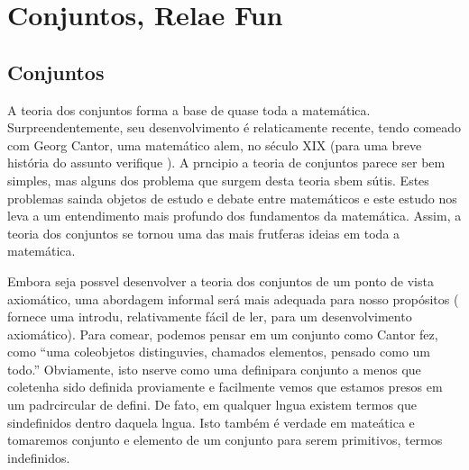 \chapter{Conjuntos, Rela\coes e Fun\coes}

\section{Conjuntos}\label{conjuntos}

A teoria dos conjuntos forma a base de quase toda a matem\'atica. Surpreendentemente, seu desenvolvimento \'e relaticamente recente, tendo come\cc ado com Georg Cantor, uma matem\'atico alem\aoi, no s\'eculo XIX (para uma breve hist\'oria do assunto verifique \cite{johnson:1972}). A pr\ih ncipio a teoria de conjuntos parece ser bem simples, mas alguns dos problema que surgem desta teoria s\ao bem s\'utis. Estes problemas s\ao ainda objetos de estudo e debate entre matem\'aticos e este estudo nos leva a um entendimento mais profundo dos fundamentos da matem\'atica. Assim, a teoria dos conjuntos se tornou uma das mais frut\ih feras ideias em toda a matem\'atica.

Embora seja poss\ih vel desenvolver a teoria dos conjuntos de um ponto de vista axiom\'atico, uma abordagem informal ser\'a mais adequada para nosso prop\'ositos (\cite{halmos:1974} fornece uma introdu\caoi, relativamente f\'acil de ler, para um desenvolvimento axiom\'atico). Para come\cc ar, podemos pensar em um conjunto como Cantor fez, como ``uma cole\cao objetos distingu\ih vies, chamados elementos, pensado como um todo.'' Obviamente, isto n\ao serve como uma defini\cao para conjunto a menos que cole\cao tenha sido definida proviamente e facilmente vemos que estamos presos em um padr\ao circular de defini\cois. De fato, em qualquer l\ih ngua existem termos que s\ao indefinidos dentro daquela l\ih ngua. Isto tamb\'em \'e verdade em mate\'atica e tomaremos conjunto e elemento de um conjunto para serem primitivos, termos indefinidos.

